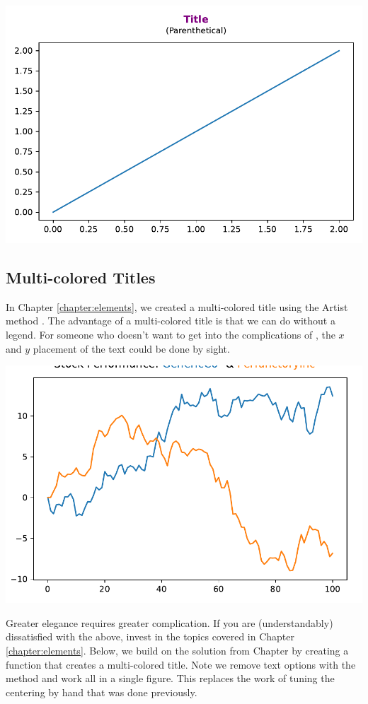 
\begin{center}
    \includegraphics[width = .80\textwidth]{figures/proseplots/subtitle.pdf}
\end{center}


\subsection{Multi-colored Titles}


In Chapter \ref{chapter:elements}, we created a multi-colored title using the Artist method . The advantage of a multi-colored title is that we can do without a legend. For someone who doesn't want to get into the complications of , the $x$ and $y$ placement of the text could be done by sight. 


\begin{center}
    \includegraphics[width = .80\textwidth]{figures/proseplots/multicolor-inexact.pdf}
\end{center}

Greater elegance requires greater complication. If you are (understandably) dissatisfied with the above, invest in the topics covered in Chapter \ref{chapter:elements}. 
Below, we build on the solution from Chapter  by creating a function that creates a multi-colored title. Note we remove text options with the  method and work all in a single figure. This replaces the work of tuning the centering by hand that was done previously. 

